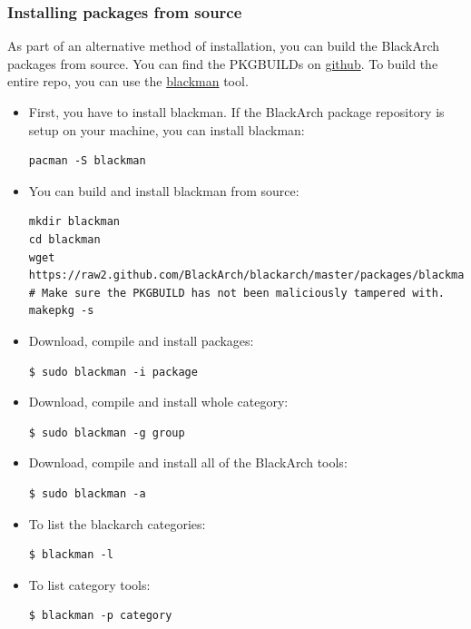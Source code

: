 \documentclass[a4paper, twoside, 11pt]{article}
\begin{document}
\subsubsection{Installing packages from source}
As part of an alternative method of installation, you can build the BlackArch
packages from source. You can find the PKGBUILDs on
\href{https://github.com/BlackArch/blackarch/tree/master/packages}{github}. To
build the entire repo, you can use the
\href{https://github.com/BlackArch/blackman}{blackman} tool.
\begin{itemize}
\item First, you have to install blackman. If the BlackArch package repository
is setup on your machine, you can install blackman:
{\small
\begin{verbatim}
pacman -S blackman
\end{verbatim}
}
\item You can build and install blackman from source:
{\small
\begin{verbatim}
mkdir blackman
cd blackman
wget https://raw2.github.com/BlackArch/blackarch/master/packages/blackman/PKGBUILD
# Make sure the PKGBUILD has not been maliciously tampered with.
makepkg -s
\end{verbatim}
}
\item Download, compile and install packages:
{\small
\begin{verbatim}
$ sudo blackman -i package
\end{verbatim}
}
\item Download, compile and install whole category:
{\small
\begin{verbatim}
$ sudo blackman -g group
\end{verbatim}
}
\item Download, compile and install all of the BlackArch tools:
{\small
\begin{verbatim}
$ sudo blackman -a
\end{verbatim}
}
\item To list the blackarch categories:
{\small
\begin{verbatim}
$ blackman -l
\end{verbatim}
}
\item To list category tools:
{\small
\begin{verbatim}
$ blackman -p category
\end{verbatim}
}
\end{itemize}
\end{document}
